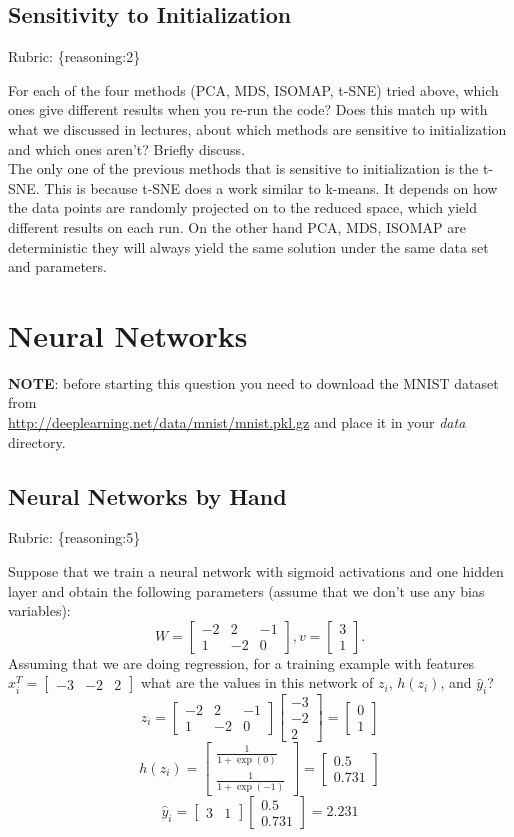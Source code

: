 \documentclass{article}
\def\rubric#1{\gre{Rubric: \{#1\}}}{}
\def\blu#1{{\color{blu}#1}}
\def\gre#1{{\color{gre}#1}}
\def\ans#1{{\color{ans}#1}}
\newcommand{\mat}[1]{\begin{bmatrix}#1\end{bmatrix}}
\begin{document}
\subsection{Sensitivity to Initialization}
\rubric{reasoning:2}

For each of the four methods (PCA, MDS, ISOMAP, t-SNE) tried above, which ones give different results when you re-run the code? Does this match up with what we discussed in lectures, about which methods are sensitive to initialization and which ones aren't? Briefly discuss. \\
\ans{
    The only one of the previous methods that is sensitive to initialization is the t-SNE. 
    This is because t-SNE does a work similar to k-means. It depends on how the data points
    are randomly projected on to the reduced space, which yield different results on each 
    run. On the other hand PCA, MDS, ISOMAP are deterministic they will always yield the 
    same solution under the same data set and parameters.
}


\section{Neural Networks}

\textbf{NOTE}: before starting this question you need to download the MNIST dataset from \\ \url{http://deeplearning.net/data/mnist/mnist.pkl.gz} and place it in your \emph{data} directory.


\subsection{Neural Networks by Hand}
\rubric{reasoning:5}

Suppose that we train a neural network with sigmoid activations and one hidden layer and obtain the following parameters (assume that we don't use any bias variables):
\[
W = \mat{-2 & 2 & -1\\1 & -2 & 0}, v = \mat{3 \\1}.
\]
Assuming that we are doing regression, \blu{for a training example with features $x_i^T = \mat{-3 &-2 & 2}$ what are the values in this network of $z_i$, $h(z_i)$, and $\hat{y}_i$?}
\ans{
    \[ z_i = \mat{-2 & 2 & -1\\1 & -2 & 0} \mat{-3 \\-2 \\ 2} =  \mat{0 \\ 1} \]
    \[ h(z_i) = \mat{\frac{1}{1+\exp(0)} \\ \frac{1}{1+\exp(-1)}} = \mat{0.5 \\ 0.731} \]
    \[ \hat{y}_i = \mat{3 & 1} \mat{0.5 \\ 0.731} = 2.231 \]
}
\end{document}
